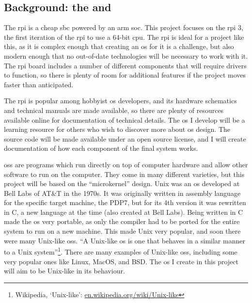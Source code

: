 \documentclass{article}
\begin{document}
\subsection*{Background: the  and }
The \gls{rpi} is a cheap \gls{sbc} powered by an \gls{arm} \gls{soc}. This
project focuses on the \gls{rpi} 3, the first iteration of the \gls{rpi} to use
a 64-bit \gls{cpu}. The \gls{rpi} is ideal for a project like this, as it is
complex enough that creating an \gls{os} for it is a challenge, but also modern
enough that no out-of-date technologies will be necessary to work with it. The
\gls{rpi} board includes a number of different components that will require
drivers to function, so there is plenty of room for additional features if the
project moves faster than anticipated.

The \gls{rpi} is popular among hobbyist \gls{os} developers, and its hardware
schematics and technical manuals are made available, so there are plenty of
resources available online for documentation of technical details. The \gls{os}
I develop will be a learning resource for others who wish to discover more
about \gls{os} design. The source code will be made available under an open
source license, and I will create documentation of how each component of the
final system
works.

\glspl{os} are programs which run directly on top of computer hardware and
allow other software to run on the computer. They come in many different
varieties, but this project will be based on the ``microkernel'' design. Unix
was an \gls{os} developed at Bell Labs of AT\&T in the 1970s. It was originally
written in assembly language for the specific target machine, the PDP7, but for
its 4th version it was rewritten in C, a new language at the time (also created
at Bell Labs). Being written in C made the \gls{os} very portable, as only the
compiler had to be ported for the entire system to run on a new machine. This
made Unix very popular, and soon there were many Unix-like \glspl{os}. ``A
Unix-like \gls{os} is one that behaves in a similar manner to a Unix
system''\footnote{Wikipedia, `Unix-like':
\url{en.wikipedia.org/wiki/Unix-like}}. There are many examples of Unix-like
\glspl{os}, including some very popular ones like Linux, MacOS, and BSD. The
\gls{os} I create in this project will aim to be Unix-like in its behaviour.
\end{document}
